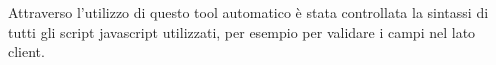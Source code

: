 Attraverso l'utilizzo di questo tool automatico è stata controllata la sintassi di tutti gli script javascript utilizzati, per esempio per validare i campi nel lato client.